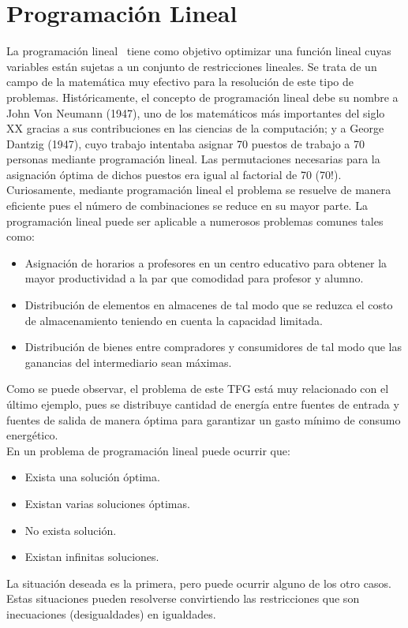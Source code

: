 \section{Programación Lineal}
La programación lineal~\cite{Loom64} tiene como objetivo optimizar una función lineal cuyas variables están sujetas a un conjunto de restricciones lineales.
Se trata de un campo de la matemática muy efectivo para la resolución de este tipo de problemas. Históricamente, el concepto de programación lineal debe su nombre a John Von Neumann (1947), uno de los matemáticos más importantes del siglo XX gracias a sus contribuciones en las ciencias de la computación; y a George Dantzig (1947), cuyo trabajo intentaba asignar 70 puestos de trabajo a 70 personas mediante programación lineal. Las permutaciones necesarias para la asignación óptima de dichos puestos era igual al factorial de 70 (70!). Curiosamente, mediante programación lineal el problema se resuelve de manera eficiente pues el número de combinaciones se reduce en su mayor parte. La programación lineal puede ser aplicable a numerosos problemas comunes tales como:
\begin{itemize}
\item Asignación de horarios a profesores en un centro educativo para obtener la mayor productividad a la par que comodidad para profesor y alumno.
\item Distribución de elementos en almacenes de tal modo que se reduzca el costo de almacenamiento teniendo en cuenta la capacidad limitada.
\item Distribución de bienes entre compradores y consumidores de tal modo que las ganancias del intermediario sean máximas.
\end{itemize}
Como se puede observar, el problema de este \gls{TFG} está muy relacionado con el último ejemplo, pues se distribuye cantidad de energía entre fuentes de entrada y fuentes de salida de manera óptima para garantizar un gasto mínimo de consumo energético.\\

En un problema de programación lineal puede ocurrir que:
\begin{itemize}
\item Exista una solución óptima.
\item Existan varias soluciones óptimas.
\item No exista solución.
\item Existan infinitas soluciones.
\end{itemize}
La situación deseada es la primera, pero puede ocurrir alguno de los otro casos. Estas situaciones pueden resolverse convirtiendo las restricciones que son inecuaciones (desigualdades) en igualdades.\\

